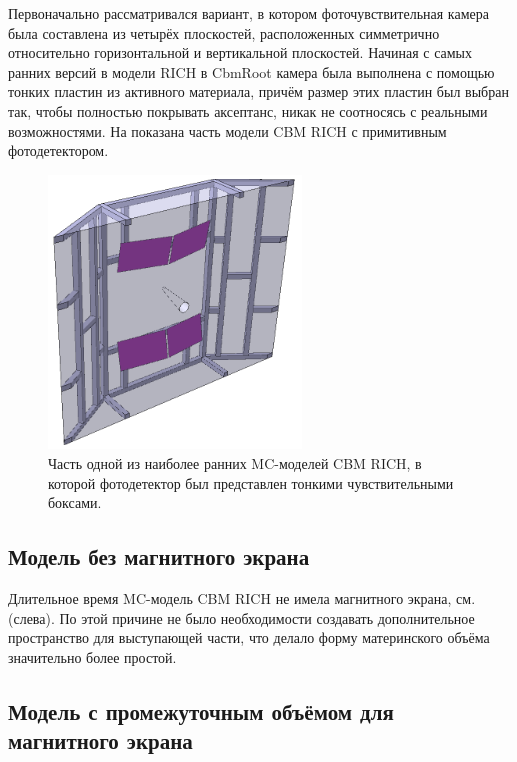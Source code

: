 Первоначально рассматривался вариант, в котором фоточувствительная камера была составлена из четырёх плоскостей, расположенных симметрично относительно горизонтальной и вертикальной плоскостей. Начиная с самых ранних версий в модели RICH в CbmRoot камера была выполнена с помощью тонких пластин из активного материала, причём размер этих пластин был выбран так, чтобы полностью покрывать аксептанс, никак не соотносясь с реальными возможностями. На  показана часть модели CBM RICH с примитивным фотодетектором.

\begin{figure}[H]
\centering
\includegraphics[width=0.6\textwidth]{pictures/PrimitivePhotodetector.png}
\caption{Часть одной из наиболее ранних MC-моделей CBM RICH, в которой фотодетектор был представлен тонкими чувствительными боксами.}
\label{fig:PrimitivePhotodetector}
\end{figure}

\subsection{Модель без магнитного экрана}\label{sec:secNoMagScreen}

Длительное время MC-модель CBM RICH не имела магнитного экрана, см. (слева). По этой причине не было необходимости создавать дополнительное пространство для выступающей части, что делало форму материнского объёма значительно более простой.

\subsection{Модель с промежуточным объёмом для магнитного экрана}\label{sec:secInterVolMagScreen}

